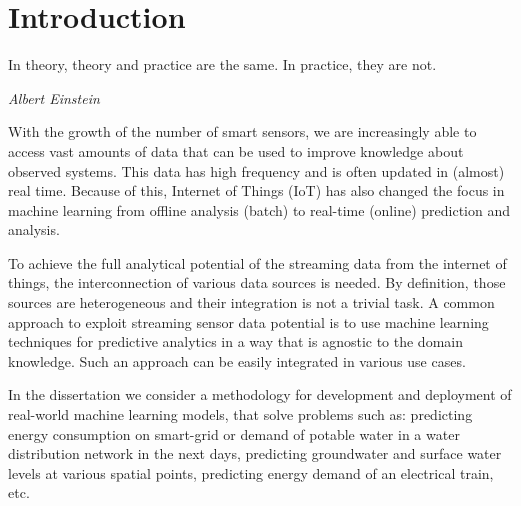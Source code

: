 % 
\chapter{Introduction}
\label{ch:introduction}

\epigraph{In theory, theory and practice are the same. In practice, they are not.}{\textit{Albert Einstein}}



With the growth of the number of smart sensors, we are increasingly able to access vast amounts of data that can be used to improve knowledge about observed systems. 
This data has high frequency and is often updated in (almost) real time.
Because of this, Internet of Things (IoT) has also changed the focus in machine learning from offline analysis (batch) to real-time (online) prediction and analysis. 

To achieve the full analytical potential of the streaming data from the internet of things, the interconnection of various data sources is needed.
By definition, those sources are heterogeneous and their integration is not a trivial task.
A common approach to exploit streaming sensor data potential is to use machine learning techniques for predictive analytics in a way that is agnostic to the domain knowledge.
Such an approach can be easily integrated in various use cases.

In the dissertation we consider a methodology for development and deployment of real-world machine learning models, that solve problems such as: predicting energy consumption on smart-grid or demand of potable water in a water distribution network in the next days, predicting groundwater and surface water levels at various spatial points, predicting energy demand of an electrical train, etc.

